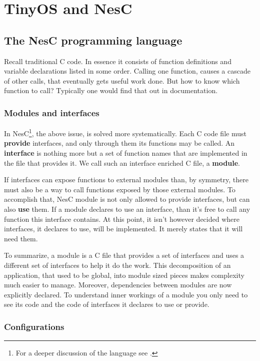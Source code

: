 \chapter{TinyOS and NesC}

\section{The NesC programming language}

Recall traditional C code. In essence it consists of function
definitions and variable declarations listed in some order.  Calling
one function, causes a cascade of other calls, that eventually gets
useful work done. But how to know which function to call? Typically one
would find that out in documentation.

\subsection{Modules and interfaces}

In NesC\footnote{For a deeper discussion of the language see
\cite{NesC}.}, the above issue, is solved more systematically.  Each C code
file must {\bf provide} interfaces, and only through them its
functions may be called. An {\bf interface} is nothing more but a set
of function names that are implemented in the file that provides it.
We call such an interface enriched C file, a {\bf module}.

If interfaces can expose functions to external modules than, by
symmetry, there must also be a way to call functions exposed by those
external modules. To accomplish that, NesC module is not only allowed
to provide interfaces, but can also {\bf use} them. If a module declares to
use an interface, than it's free to call any function this interface
contains. At this point, it isn't however decided where interfaces, it
declares to use, will be implemented. It merely states that it will
need them.

To summarize, a module is a C file that provides a set of interfaces
and uses a different set of interfaces to help it do the work. This
decomposition of an application, that used to be global, into module
sized pieces makes complexity much easier to manage. Moreover,
dependencies between modules are now explicitly declared. To understand
inner workings of a module you only need to see its code and the code
of interfaces it declares to use or provide.

\subsection{Configurations}

